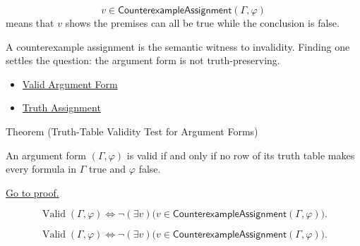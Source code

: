 \begin{remark*}
\[
  v\in\mathsf{CounterexampleAssignment}(\Gamma,\varphi)
\] means that \(v\)
shows the premises can all be true while the conclusion is false.
\end{remark*}

\begin{remark*}[Interpretation]
A counterexample assignment is the semantic witness to invalidity. Finding one
settles the question: the argument form is not truth-preserving.
\end{remark*}

\begin{dependencies}
\begin{itemize}
  \item \hyperref[def:valid-argument-form-propositional-logic]{Valid Argument Form}
  \item \hyperref[def:truth-assignment-propositional-logic]{Truth Assignment}
\end{itemize}
\end{dependencies}

\begin{theorembox}{Theorem (Truth-Table Validity Test for Argument Forms)}
\begin{theorem}
\label{thm:truth-table-validity-test-argument-forms-propositional-logic}
An argument form \((\Gamma,\varphi)\) is valid if and only if no row of its truth
table makes every formula in \(\Gamma\) true and \(\varphi\) false.

\noindent\hyperref[prf:truth-table-validity-test-argument-forms-propositional-logic]{Go to proof.}
\end{theorem}
\end{theorembox}

\begin{remark*}
\[
\operatorname{Valid}(\Gamma,\varphi)
\Longleftrightarrow
\neg(\exists v)\bigl(v\in\mathsf{CounterexampleAssignment}(\Gamma,\varphi)\bigr).
\]
\end{remark*}

\begin{remark*}
\[
\operatorname{Valid}(\Gamma,\varphi)
\Longleftrightarrow
\neg(\exists v)\bigl(v\in\mathsf{CounterexampleAssignment}(\Gamma,\varphi)\bigr).
\]
\end{remark*}



